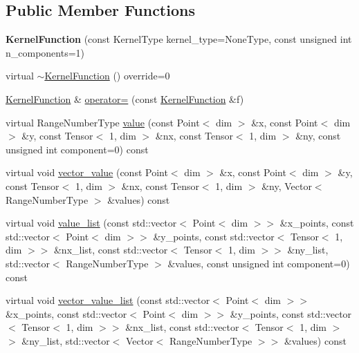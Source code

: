 \subsection*{Public Member Functions}
\begin{DoxyCompactItemize}
\item 
\mbox{\label{classLaplaceBEM_1_1LaplaceKernel_1_1KernelFunction_a1f10a1886e4b9aed7d60c036ccc81ee6}} 
{\bfseries Kernel\+Function} (const Kernel\+Type kernel\+\_\+type=None\+Type, const unsigned int n\+\_\+components=1)
\item 
virtual \hyperlink{classLaplaceBEM_1_1LaplaceKernel_1_1KernelFunction_a2611849d182d0869c6f07026416305b3}{$\sim$\+Kernel\+Function} () override=0
\item 
\hyperlink{classLaplaceBEM_1_1LaplaceKernel_1_1KernelFunction}{Kernel\+Function} \& \hyperlink{classLaplaceBEM_1_1LaplaceKernel_1_1KernelFunction_a2a9a7e11aca4e52ece2d721e60a4bf56}{operator=} (const \hyperlink{classLaplaceBEM_1_1LaplaceKernel_1_1KernelFunction}{Kernel\+Function} \&f)
\item 
virtual Range\+Number\+Type \hyperlink{classLaplaceBEM_1_1LaplaceKernel_1_1KernelFunction_aee6c638a4392616e89784d7b6558dd24}{value} (const Point$<$ dim $>$ \&x, const Point$<$ dim $>$ \&y, const Tensor$<$ 1, dim $>$ \&nx, const Tensor$<$ 1, dim $>$ \&ny, const unsigned int component=0) const
\item 
virtual void \hyperlink{classLaplaceBEM_1_1LaplaceKernel_1_1KernelFunction_aa8110379ffcda0d7aabeb1b9229fa8db}{vector\+\_\+value} (const Point$<$ dim $>$ \&x, const Point$<$ dim $>$ \&y, const Tensor$<$ 1, dim $>$ \&nx, const Tensor$<$ 1, dim $>$ \&ny, Vector$<$ Range\+Number\+Type $>$ \&values) const
\item 
virtual void \hyperlink{classLaplaceBEM_1_1LaplaceKernel_1_1KernelFunction_a8ba5755bf65478154209736c001f2f2a}{value\+\_\+list} (const std\+::vector$<$ Point$<$ dim $>$$>$ \&x\+\_\+points, const std\+::vector$<$ Point$<$ dim $>$$>$ \&y\+\_\+points, const std\+::vector$<$ Tensor$<$ 1, dim $>$$>$ \&nx\+\_\+list, const std\+::vector$<$ Tensor$<$ 1, dim $>$$>$ \&ny\+\_\+list, std\+::vector$<$ Range\+Number\+Type $>$ \&values, const unsigned int component=0) const
\item 
virtual void \hyperlink{classLaplaceBEM_1_1LaplaceKernel_1_1KernelFunction_ae906434f76ac27668ab4ddf91e3cd7fb}{vector\+\_\+value\+\_\+list} (const std\+::vector$<$ Point$<$ dim $>$$>$ \&x\+\_\+points, const std\+::vector$<$ Point$<$ dim $>$$>$ \&y\+\_\+points, const std\+::vector$<$ Tensor$<$ 1, dim $>$$>$ \&nx\+\_\+list, const std\+::vector$<$ Tensor$<$ 1, dim $>$$>$ \&ny\+\_\+list, std\+::vector$<$ Vector$<$ Range\+Number\+Type $>$$>$ \&values) const
\end{DoxyCompactItemize}
